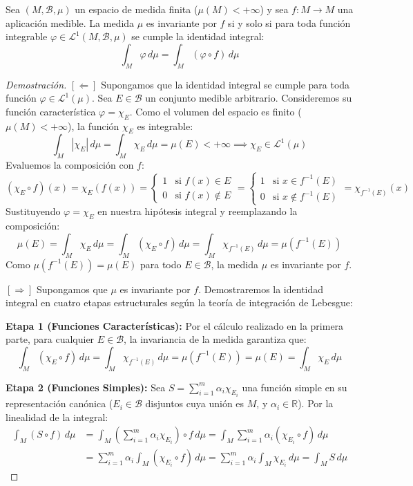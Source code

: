 \begin{teorema}
	Sea $(M, \mathcal{B}, \mu)$ un espacio de medida finita ($\mu(M) < +\infty$) y sea $f: M \to M$ una aplicación medible. La medida $\mu$ es invariante por $f$ si y solo si para toda función integrable $\varphi \in \mathcal{L}^1(M, \mathcal{B}, \mu)$ se cumple la identidad integral:
	$$ \int_M \varphi \, d\mu = \int_M (\varphi \circ f) \, d\mu $$
\end{teorema}

\begin{proof}[Demostración]
	$[\Leftarrow]$ Supongamos que la identidad integral se cumple para toda función $\varphi \in \mathcal{L}^1(\mu)$. Sea $E \in \mathcal{B}$ un conjunto medible arbitrario. Consideremos su función característica $\varphi = \chi_E$. Como el volumen del espacio es finito ($\mu(M) < +\infty$), la función $\chi_E$ es integrable:
	$$ \int_M |\chi_E| \, d\mu = \int_M \chi_E \, d\mu = \mu(E) < +\infty \implies \chi_E \in \mathcal{L}^1(\mu) $$
	Evaluemos la composición con $f$:
	$$ (\chi_E \circ f)(x) = \chi_E(f(x)) = \begin{cases} 1 & \text{si } f(x) \in E \\ 0 & \text{si } f(x) \notin E \end{cases} = \begin{cases} 1 & \text{si } x \in f^{-1}(E) \\ 0 & \text{si } x \notin f^{-1}(E) \end{cases} = \chi_{f^{-1}(E)}(x) $$
	Sustituyendo $\varphi = \chi_E$ en nuestra hipótesis integral y reemplazando la composición:
	$$ \mu(E) = \int_M \chi_E \, d\mu = \int_M (\chi_E \circ f) \, d\mu = \int_M \chi_{f^{-1}(E)} \, d\mu = \mu(f^{-1}(E)) $$
	Como $\mu(f^{-1}(E)) = \mu(E)$ para todo $E \in \mathcal{B}$, la medida $\mu$ es invariante por $f$.
	
	$[\Rightarrow]$ Supongamos que $\mu$ es invariante por $f$. Demostraremos la identidad integral en cuatro etapas estructurales según la teoría de integración de Lebesgue:
	
	\textbf{Etapa 1 (Funciones Características):} Por el cálculo realizado en la primera parte, para cualquier $E \in \mathcal{B}$, la invariancia de la medida garantiza que:
	$$ \int_M (\chi_E \circ f) \, d\mu = \int_M \chi_{f^{-1}(E)} \, d\mu = \mu(f^{-1}(E)) = \mu(E) = \int_M \chi_E \, d\mu $$
	
	\textbf{Etapa 2 (Funciones Simples):} Sea $S = \sum_{i=1}^m \alpha_i \chi_{E_i}$ una función simple en su representación canónica ($E_i \in \mathcal{B}$ disjuntos cuya unión es $M$, y $\alpha_i \in \mathbb{R}$). Por la linealidad de la integral:
	\begin{align*}
		\int_M (S \circ f) \, d\mu &= \int_M \left( \sum_{i=1}^m \alpha_i \chi_{E_i} \right) \circ f \, d\mu = \int_M \sum_{i=1}^m \alpha_i (\chi_{E_i} \circ f) \, d\mu \\
		&= \sum_{i=1}^m \alpha_i \int_M (\chi_{E_i} \circ f) \, d\mu = \sum_{i=1}^m \alpha_i \int_M \chi_{E_i} \, d\mu = \int_M S \, d\mu
	\end{align*}
	

\end{proof}
